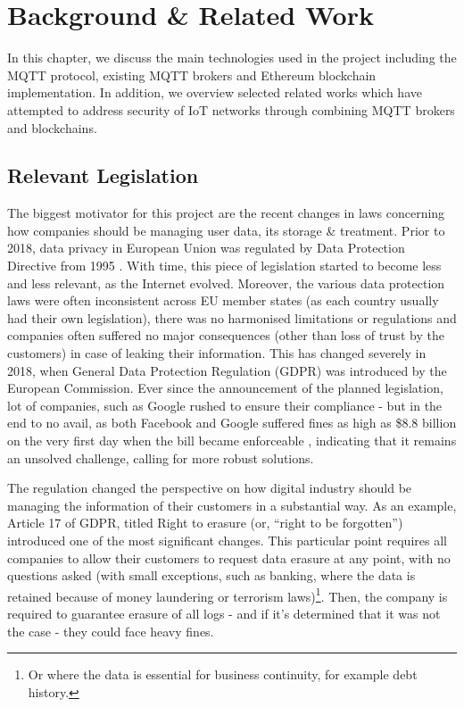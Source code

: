 \chapter{Background \& Related Work}

In this chapter, we discuss the main technologies used in the project including the MQTT protocol, existing MQTT brokers and Ethereum blockchain implementation. In addition, we overview selected related works which have attempted to address security of IoT networks through combining MQTT brokers and blockchains.
\section{Relevant Legislation}
The biggest motivator for this project are the recent changes in laws concerning how companies should be managing user data, its storage \& treatment. Prior to 2018, data privacy in European Union was regulated by Data Protection Directive from 1995 \cite{directive199595}. With time, this piece of legislation started to become less and less relevant, as the Internet evolved. Moreover, the various data protection laws were often inconsistent across EU member states (as each country usually had their own legislation), there was no harmonised limitations or regulations and companies often suffered no major consequences (other than loss of trust by the customers) in case of leaking their information. This has changed severely in 2018, when General Data Protection Regulation (GDPR) \cite{EUdataregulations2018} was introduced by the European Commission. Ever since the announcement of the planned legislation, lot of companies, such as Google rushed to ensure their compliance - but in the end to no avail, as both Facebook and Google suffered fines as high as \$8.8 billion on the very first day when the bill became enforceable \citep{brandom2018facebook}, indicating that it remains an unsolved challenge, calling for more robust solutions.

The regulation changed the perspective on how digital industry should be managing the information of their customers in a substantial way. As an example, Article 17 of GDPR, titled Right to erasure (or, ``right to be forgotten'') introduced one of the most significant changes. This particular point requires all companies to allow their customers to request data erasure at any point, with no questions asked (with small exceptions, such as banking, where the data is retained because of money laundering or terrorism laws)\footnote{Or where the data is essential for business continuity, for example debt history.}. Then, the company is required to guarantee erasure of all logs - and if it's determined that it was not the case - they could face heavy fines.

